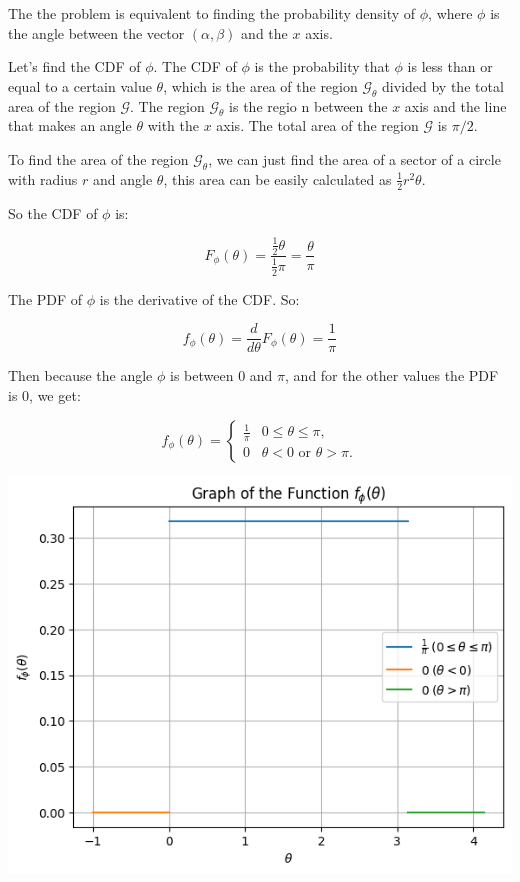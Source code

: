 The the problem is equivalent to finding the probability density of $\phi$,
where $\phi$ is the angle between the vector $(\alpha, \beta)$ and the $x$ axis.

Let's find the CDF of $\phi$. The CDF of $\phi$ is the probability that
$\phi$ is less than or equal to a certain value $\theta$, which is the
area of the region $\mathcal{G}_\theta$ divided by the total area of
the region $\mathcal{G}$. The region $\mathcal{G}_\theta$ is the regio
n between the $x$ axis and the line that makes an angle $\theta$ with
the $x$ axis. The total area of the region $\mathcal{G}$ is $\pi / 2$.

To find the area of the region $\mathcal{G}_\theta$, we can just
find the area of a sector of a circle with radius $r$ and angle $\theta$,
this area can be easily calculated as $\frac{1}{2} r^2 \theta$.

So the CDF of $\phi$ is:

\begin{equation}
    F_\phi(\theta) = \frac{\frac{1}{2} \theta}{\frac{1}{2} \pi} = \frac{\theta}{\pi}
\end{equation}

The PDF of $\phi$ is the derivative of the CDF. So:

\begin{equation}
    f_\phi(\theta) = \frac{d}{d\theta} F_\phi(\theta) = \frac{1}{\pi}
\end{equation}

Then because the angle $\phi$ is between $0$ and $\pi$, and for
the other values the PDF is $0$, we get:

\begin{equation}
    f_\phi(\theta) =
    \begin{cases}
        \frac{1}{\pi} & 0 \leq \theta \leq \pi,              \\
        0             & \theta < 0 \text{ or } \theta > \pi.
    \end{cases}
\end{equation}

\includegraphics[width=\textwidth]{images/p2.png}